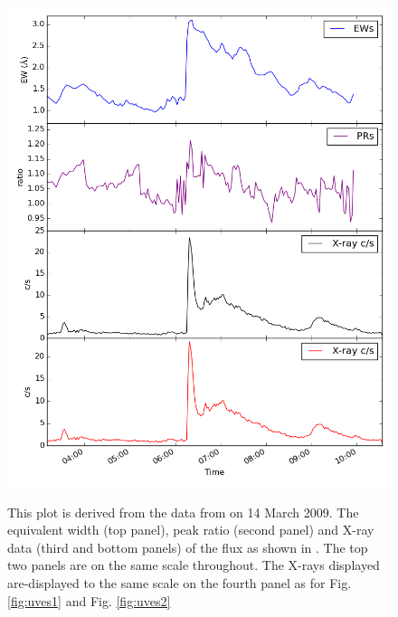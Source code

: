 \begin{figure}[!htbp]
\centering
\includegraphics[scale=0.30]{Figures/uves3.png} \\
\caption{This plot is derived from the data from {\uves} on 14 March 2009.
  The equivalent width (top panel), peak ratio (second panel) and X-ray data (third and bottom panels) of the
  {\ha} flux as shown in \citet[Fig. 1]{fuhrmeister11}. The top two panels are on the same scale
  throughout. The X-rays displayed are-displayed to the same scale on the fourth panel as for Fig. \ref{fig:uves1} and
  Fig. \ref{fig:uves2}}
 \protect\label{fig:uves3}
\end{figure}

